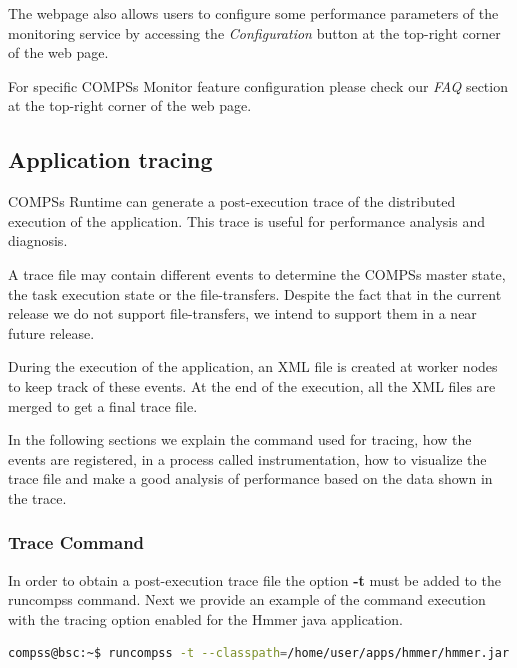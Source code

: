 
The webpage also allows users to configure some performance parameters of the monitoring service by accessing the 
\textit{Configuration} button at the top-right corner of the web page. 

For specific COMPSs Monitor feature configuration please check our \textit{FAQ} section at the top-right corner of the web page. 


\subsection{Application tracing}
\label{sec:Tracing}
COMPSs Runtime can generate a post-execution trace of the distributed execution of the application. This trace is useful for
performance analysis and diagnosis.

A trace file may contain different events to determine the COMPSs master state, the task execution state or the file-transfers.
Despite the fact that in the current release we do not support file-transfers, we intend to support them in a near future release.

During the execution of the application, an XML file is created at worker nodes to keep track of 
these events. At the end of the execution, all the XML files are merged to get a final trace file.

In the following sections we explain the command used for tracing, how the events are registered, 
in a process called instrumentation, how to visualize the trace file and make a good analysis of 
performance based on the data shown in the trace.

\subsubsection{Trace Command}
In order to obtain a post-execution trace file the option \textbf{-t}  must be added to the runcompss command. Next we provide an
example of the command execution with the tracing option enabled for the Hmmer java application.
\begin{lstlisting}[language=bash]
compss@bsc:~$ runcompss -t --classpath=/home/user/apps/hmmer/hmmer.jar hmmerobj.HMMPfam /sharedDisk/Hmmer/smart.HMMs.bin /sharedDisk/Hmmer/256seq /home/user/out.txt 2 8 -A 222
\end{lstlisting}
 

